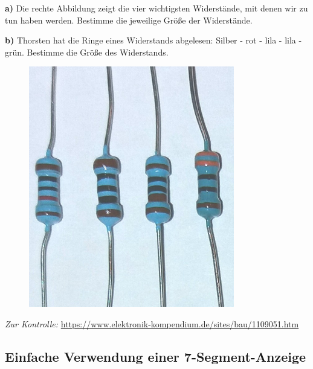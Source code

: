 \vfill
\newpage
\begin{aufgabe}
	
	\begin{minipage}{0.78\textwidth}
		\textbf{a)} Die rechte Abbildung zeigt die vier wichtigsten Widerstände, mit denen wir zu tun haben werden. Bestimme die jeweilige Größe der Widerstände.
		
		\textbf{b)} Thorsten hat die Ringe eines Widerstands abgelesen: Silber - rot - lila - lila - grün. Bestimme die Größe des Widerstands.
	\end{minipage}
	\hfill
	\begin{minipage}{0.2\textwidth}
		\begin{figure}[H]
			\centering
			\includegraphics[width=0.8\textwidth,angle=90]{pics/Widerstaende.jpg}
			\label{abb:widerstaende2}
		\end{figure}
	\end{minipage}
	
	\medskip
	\emph{Zur Kontrolle:} \url{https://www.elektronik-kompendium.de/sites/bau/1109051.htm}
\end{aufgabe}


\subsection{Einfache Verwendung einer 7-Segment-Anzeige}

